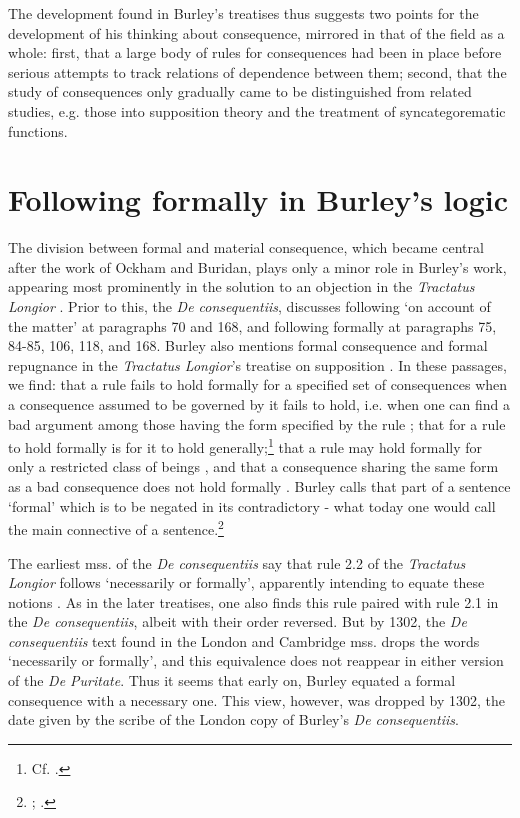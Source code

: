 \documentclass[]{birkjour}
\begin{document}
The development found in Burley's treatises thus suggests two points for the development of his thinking about consequence, mirrored in that of the field as a whole: first, that a large body of rules for consequences had been in place before serious attempts to track relations of dependence between them; second, that the study of consequences only gradually came to be distinguished from related studies, e.g. those into supposition theory and the treatment of syncategorematic functions.
\section{Following formally in Burley's logic}
The division between formal and material consequence, which became central after the work of Ockham and Buridan, plays only a minor role in Burley's work, appearing most prominently in the solution to an objection in the \textit{Tractatus Longior} \autocite[p. 80.13-29, 84.8-86.21]{BurleyDPAL}. Prior to this, the \textit{De consequentiis}, discusses following `on account of the matter' at paragraphs 70 and 168, and following formally at paragraphs 75, 84-85, 106, 118, and 168.  Burley also mentions formal consequence and formal repugnance in the \textit{Tractatus Longior}'s treatise on supposition \autocite[25.21, 39.20]{BurleyDPAL}. In these passages, we find: that a rule fails to hold formally for a specified set of consequences when a consequence assumed to be governed by it fails to hold, i.e. when one can find a bad argument among those having the form specified by the rule \autocite[p. 130, par. 75]{Green-Pedersen1980b}; that for a rule to hold formally is for it to hold generally;\footnote{Cf. \autocite[p. 130, par. 75, 76]{Green-Pedersen1980b}.} that a rule may hold formally for only a restricted class of beings \autocite[p. 157-158, par. 159]{Green-Pedersen1980b}, and that a consequence sharing the same form as a bad consequence does not hold formally \autocite[p. 25.21]{BurleyDPAL}. Burley calls that part of a sentence `formal' which is to be negated in its contradictory - what today one would call the main connective of a sentence.\footnote{\autocite[pp. 73.29; 208.12-30]{BurleyDPAL}; \autocite[p. 120, par. 40]{Green-Pedersen1980b}.}

The earliest mss. of the \textit{De consequentiis} say that rule 2.2 of the \textit{Tractatus Longior} follows `necessarily or formally', apparently intending to equate these notions \autocite[p. 132, par. 84]{Green-Pedersen1980b}. As in the later treatises, one also finds this rule paired with rule 2.1 in the \textit{De consequentiis}, albeit with their order reversed. But by 1302, the \textit{De consequentiis} text found in the London and Cambridge mss. drops the words `necessarily or formally', and this equivalence does not reappear in either version of the \textit{De Puritate}. Thus it seems that early on, Burley equated a formal consequence with a necessary one. This view, however, was dropped by 1302, the date given by the scribe of the London copy of Burley's \textit{De consequentiis}.
\end{document}
